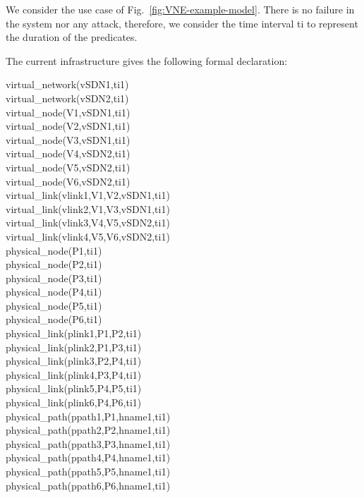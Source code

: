 We consider the use case of Fig.~\ref{fig:VNE-example-model}.
There is no failure in the system nor any attack, therefore, we consider the time interval ti to represent the duration of the predicates.



The current infrastructure gives the following formal declaration:


virtual\_network(vSDN1,ti1)\\
virtual\_network(vSDN2,ti1)\\
virtual\_node(V1,vSDN1,ti1)\\
virtual\_node(V2,vSDN1,ti1)\\
virtual\_node(V3,vSDN1,ti1)\\
virtual\_node(V4,vSDN2,ti1)\\
virtual\_node(V5,vSDN2,ti1)\\
virtual\_node(V6,vSDN2,ti1)\\
virtual\_link(vlink1,V1,V2,vSDN1,ti1)\\
virtual\_link(vlink2,V1,V3,vSDN1,ti1)\\
virtual\_link(vlink3,V4,V5,vSDN2,ti1)\\
virtual\_link(vlink4,V5,V6,vSDN2,ti1)\\
physical\_node(P1,ti1)\\
physical\_node(P2,ti1)\\
physical\_node(P3,ti1)\\
physical\_node(P4,ti1)\\
physical\_node(P5,ti1)\\
physical\_node(P6,ti1)\\
physical\_link(plink1,P1,P2,ti1)\\
physical\_link(plink2,P1,P3,ti1)\\
physical\_link(plink3,P2,P4,ti1)\\
physical\_link(plink4,P3,P4,ti1)\\
physical\_link(plink5,P4,P5,ti1)\\
physical\_link(plink6,P4,P6,ti1)\\
physical\_path(ppath1,P1,hname1,ti1)\\
physical\_path(ppath2,P2,hname1,ti1)\\
physical\_path(ppath3,P3,hname1,ti1)\\
physical\_path(ppath4,P4,hname1,ti1)\\
physical\_path(ppath5,P5,hname1,ti1)\\
physical\_path(ppath6,P6,hname1,ti1)\\
